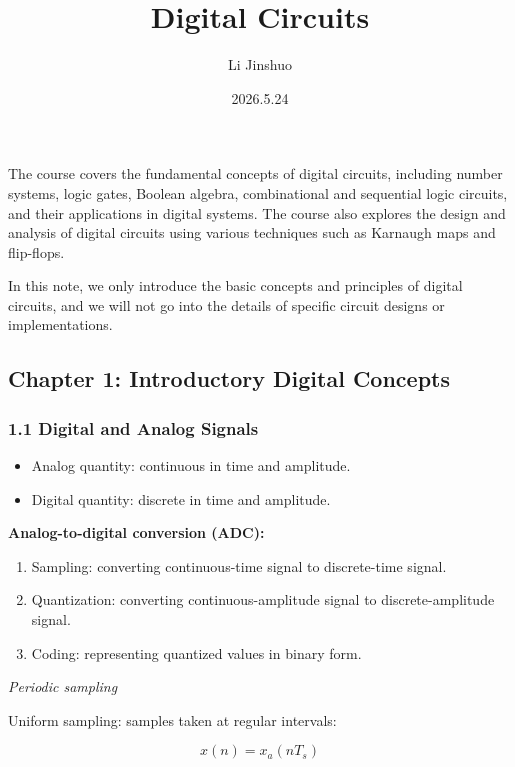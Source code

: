 \documentclass[
  a4paper,
]{article}
\title{Digital Circuits}
\author{Li Jinshuo}
\date{2026.5.24}
\providecommand{\tightlist}{%
  \setlength{\itemsep}{0pt}\setlength{\parskip}{0pt}}
\begin{document}
\maketitle

The course covers the fundamental concepts of digital circuits,
including number systems, logic gates, Boolean algebra, combinational
and sequential logic circuits, and their applications in digital
systems. The course also explores the design and analysis of digital
circuits using various techniques such as Karnaugh maps and flip-flops.

In this note, we only introduce the basic concepts and principles of
digital circuits, and we will not go into the details of specific
circuit designs or implementations.

\subsection{Chapter 1: Introductory Digital
Concepts}\label{chapter-1-introductory-digital-concepts}

\subsubsection{1.1 Digital and Analog
Signals}\label{digital-and-analog-signals}

\begin{itemize}
\tightlist
\item
  Analog quantity: continuous in time and amplitude.
\item
  Digital quantity: discrete in time and amplitude.
\end{itemize}

\textbf{Analog-to-digital conversion (ADC):}

\begin{enumerate}
\def\labelenumi{\arabic{enumi}.}
\tightlist
\item
  Sampling: converting continuous-time signal to discrete-time signal.
\item
  Quantization: converting continuous-amplitude signal to
  discrete-amplitude signal.
\item
  Coding: representing quantized values in binary form.
\end{enumerate}

\emph{Periodic sampling}

Uniform sampling: samples taken at regular intervals:

\[x(n) = x_a(nT_s)\]
\end{document}
